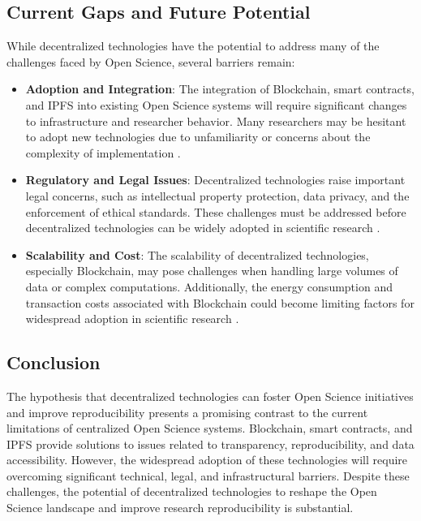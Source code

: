 \documentclass{article}
\begin{document}
\subsection{Current Gaps and Future Potential}
While decentralized technologies have the potential to address many of the challenges faced by Open Science, several barriers remain:
\begin{itemize}
    \item \textbf{Adoption and Integration}: The integration of Blockchain, smart contracts, and IPFS into existing Open Science systems will require significant changes to infrastructure and researcher behavior. Many researchers may be hesitant to adopt new technologies due to unfamiliarity or concerns about the complexity of implementation \cite{Leonelli2016}.
    \item \textbf{Regulatory and Legal Issues}: Decentralized technologies raise important legal concerns, such as intellectual property protection, data privacy, and the enforcement of ethical standards. These challenges must be addressed before decentralized technologies can be widely adopted in scientific research \cite{Borgman2012}.
    \item \textbf{Scalability and Cost}: The scalability of decentralized technologies, especially Blockchain, may pose challenges when handling large volumes of data or complex computations. Additionally, the energy consumption and transaction costs associated with Blockchain could become limiting factors for widespread adoption in scientific research \cite{Boulton2015}.
\end{itemize}

\subsection{Conclusion}
The hypothesis that decentralized technologies can foster Open Science initiatives and improve reproducibility presents a promising contrast to the current limitations of centralized Open Science systems. Blockchain, smart contracts, and IPFS provide solutions to issues related to transparency, reproducibility, and data accessibility. However, the widespread adoption of these technologies will require overcoming significant technical, legal, and infrastructural barriers. Despite these challenges, the potential of decentralized technologies to reshape the Open Science landscape and improve research reproducibility is substantial.





\end{document}
